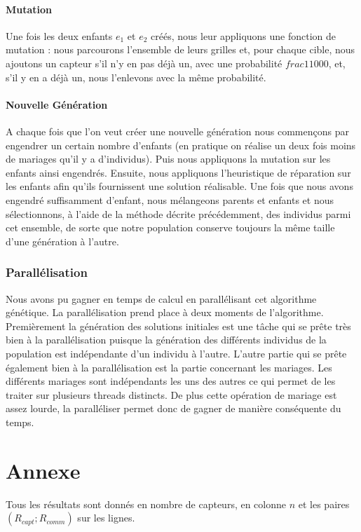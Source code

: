 \documentclass[12pt,a4paper]{article}
\begin{document}
\subsection{Mutation}
Une fois les deux enfants $e_1$ et $e_2$ créés, nous leur appliquons une fonction de mutation : nous parcourons l'ensemble de leurs grilles et, pour chaque cible, nous ajoutons un capteur s'il n'y en pas déjà un, avec une probabilité $frac{1}{1000}$, et, s'il y en a déjà un, nous l'enlevons avec la même probabilité. 

\subsection{Nouvelle Génération}
A chaque fois que l'on veut créer une nouvelle génération nous commençons par engendrer un certain nombre d'enfants (en pratique on réalise un deux fois moins de mariages qu'il y a d'individus). Puis nous appliquons la mutation sur les enfants ainsi engendrés. Ensuite, nous appliquons l'heuristique de réparation sur les enfants afin qu'ils fournissent une solution réalisable. Une fois que nous avons engendré suffisamment d'enfant, nous mélangeons parents et enfants et nous sélectionnons, à l'aide de la méthode décrite précédemment, des individus parmi cet ensemble, de sorte que notre population conserve toujours la même taille d'une génération à l'autre. 

\section{Parallélisation}
Nous avons pu gagner en temps de calcul en parallélisant cet algorithme génétique. La parallélisation prend place à deux moments de l'algorithme. Premièrement la génération des solutions initiales est une tâche qui se prête très bien à la parallélisation puisque la génération des différents individus de la population est indépendante d'un individu à l'autre.
L'autre partie qui se prête également bien à la parallélisation est la partie concernant les mariages. Les différents mariages sont indépendants les uns des autres ce qui permet de les traiter sur plusieurs threads distincts. De plus cette opération de mariage est assez lourde, la paralléliser permet donc de gagner de manière conséquente du temps. 




\part{Annexe}
Tous les résultats sont donnés en nombre de capteurs, en colonne $n$ et les paires $(R_{capt};R_{comm})$ sur les lignes.
\end{document}
